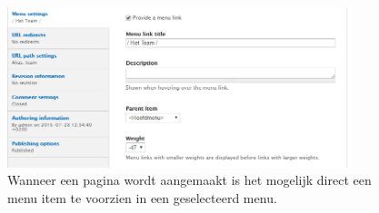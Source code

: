 \begin{figure}[!ht]
  \includegraphics[width=100mm]{img/dr-theme-content-menu.png}
  \centering
  \caption{Wanneer een pagina wordt aangemaakt is het mogelijk direct een menu item te voorzien in een geselecteerd menu.}
  \label{fig:Drupal thema content menu.}
\end{figure}

\pagebreak

